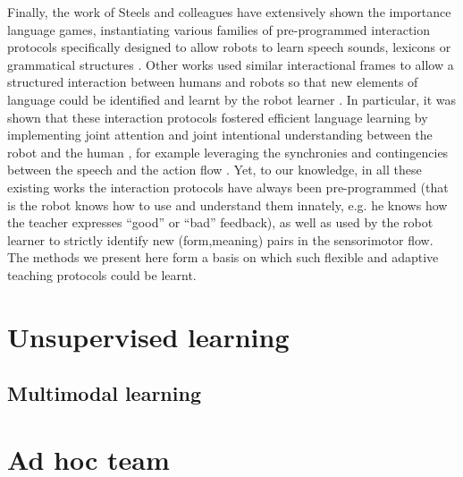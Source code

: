 Finally, the work of Steels and colleagues \cite{steels2012grounding,steels2002aibos} have extensively shown the importance language games, instantiating various families of pre-programmed interaction protocols specifically designed to allow robots to learn speech sounds\cite{de2000self,oudeyer2006self}, lexicons \cite{steels2002aibos} or grammatical structures \cite{steels06spatialLanguage, steels2008can}. Other works used similar interactional frames to allow a structured interaction between humans and robots so that new elements of language could be identified and learnt by the robot learner \cite{roy02a,lyon2012interactive,cangelosi06b,yu2004multimodal,cangelosi2010integration,sugita05a,dominey2005learning,cederborg2011imitating}. In particular, it was shown that these interaction protocols fostered efficient language learning by implementing joint attention and joint intentional understanding between the robot and the human \cite{kaplan2006challenges,yu2005role,yu2007unified}, for example leveraging the synchronies and contingencies between the speech and the action flow \cite{rohlfing2006can,schillingmann2011acoustic}. Yet, to our knowledge, in all these existing works the interaction protocols have always been pre-programmed (that is the robot knows how to use and understand them innately, e.g. he knows how the teacher expresses ``good'' or ``bad'' feedback), as well as used by the robot learner to strictly identify new (form,meaning) pairs in the sensorimotor flow. The methods we present here form a basis on which such flexible and adaptive teaching protocols could be learnt.

\section{Unsupervised learning}


\subsection{Multimodal learning}


\section{Ad hoc team}



